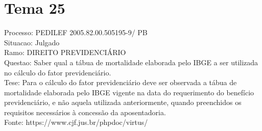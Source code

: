 \documentclass[12pt]{article}
\begin{document}
\section*{Tema 25}
Processo: PEDILEF 2005.82.00.505195-9/ PB\\
Situacao: Julgado\\
Ramo: DIREITO PREVIDENCIÁRIO\\
Questao: Saber qual a tábua de mortalidade elaborada pelo IBGE a ser utilizada no cálculo do fator previdenciário.\\
Tese: Para o cálculo do fator previdenciário deve ser observada a tábua de mortalidade elaborada pelo IBGE vigente na data do requerimento do benefício previdenciário, e não aquela utilizada anteriormente, quando preenchidos os requisitos necessários à concessão da aposentadoria.\\
Fonte: https://www.cjf.jus.br/phpdoc/virtus/
\end{document}
